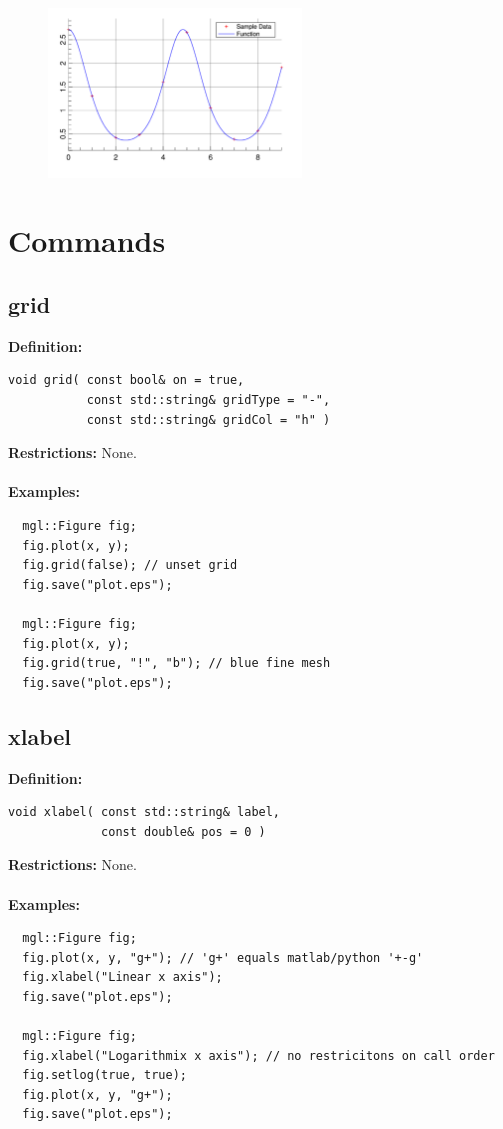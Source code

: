 \documentclass[a4paper]{article}
\newcommand{\command}[1]{\subsection{#1}}
\begin{document}
\begin{figure}[h]
  \centering
  \includegraphics[width=0.6\textwidth]{opening-example.pdf}
  \thispagestyle{empty}
\end{figure}

\restoregeometry
\newpage
\section{Commands}

\command{grid}

\textbf{Definition:}
\begin{lstlisting}
void grid( const bool& on = true, 
           const std::string& gridType = "-", 
           const std::string& gridCol = "h" )
\end{lstlisting}
%
\textbf{Restrictions:} None. \\ \\
%
\textbf{Examples:}
\begin{lstlisting}
  mgl::Figure fig;
  fig.plot(x, y);
  fig.grid(false); // unset grid
  fig.save("plot.eps");

  mgl::Figure fig;
  fig.plot(x, y);
  fig.grid(true, "!", "b"); // blue fine mesh
  fig.save("plot.eps");
\end{lstlisting}

\command{xlabel}

\textbf{Definition:}
\begin{lstlisting}
void xlabel( const std::string& label, 
             const double& pos = 0 )
\end{lstlisting}
%
\textbf{Restrictions:} None. \\ \\
%
\textbf{Examples:}
\begin{lstlisting}
  mgl::Figure fig;
  fig.plot(x, y, "g+"); // 'g+' equals matlab/python '+-g'
  fig.xlabel("Linear x axis");
  fig.save("plot.eps");

  mgl::Figure fig;
  fig.xlabel("Logarithmix x axis"); // no restricitons on call order
  fig.setlog(true, true);
  fig.plot(x, y, "g+");
  fig.save("plot.eps");
\end{lstlisting}
\end{document}
